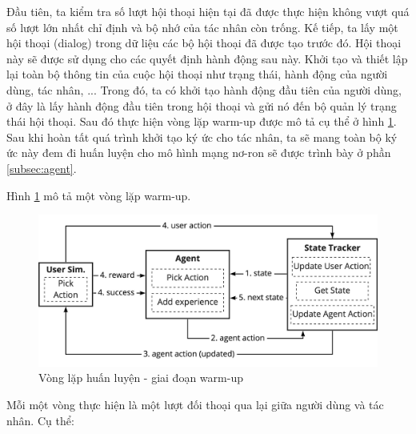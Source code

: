 Đầu tiên, ta kiểm tra số lượt hội thoại hiện tại đã được thực hiện không vượt quá số lượt lớn nhất chỉ định và bộ nhớ của tác nhân còn trống. Kế tiếp, ta lấy một hội thoại (dialog) trong dữ liệu các bộ hội thoại đã được tạo trước đó. Hội thoại này sẽ được sử dụng cho các quyết định hành động sau này. Khởi tạo và thiết lập lại toàn bộ thông tin của cuộc hội thoại như trạng thái, hành động của người dùng, tác nhân, ... Trong đó, ta có khởi tạo hành động đầu tiên của người dùng, ở đây là lấy hành động đầu tiên trong hội thoại và gửi nó đến bộ quản lý trạng thái hội thoại. Sau đó thực hiện vòng lặp warm-up được mô tả cụ thể ở hình \ref{fig:warmup}. Sau khi hoàn tất quá trình khởi tạo ký ức cho tác nhân, ta sẽ mang toàn bộ ký ức này đem đi huấn luyện cho mô hình mạng nơ-ron sẽ được trình bày ở phần \ref{subsec:agent}.

Hình \ref{fig:warmup} mô tả một vòng lặp warm-up.

\begin{center}
    \begin{figure}[h!]
        \begin{center}
         \includegraphics[scale=0.14]{chapter4/img/warmup.jpg}
        \end{center}
        \caption{Vòng lặp huấn luyện - giai đoạn warm-up}
        \label{fig:warmup}
    \end{figure}
\end{center}

Mỗi một vòng thực hiện là một lượt đối thoại qua lại giữa người dùng và tác nhân. Cụ thể:

